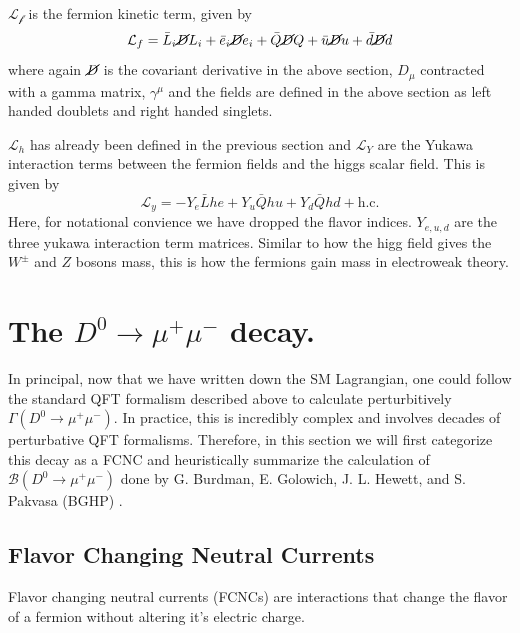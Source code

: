 $\mathcal{L_f}$ is the fermion kinetic term, given by
\begin{equation}
\mathcal{L}_{f} = \bar{L}_{i}\cancel{D}L_{i} + \bar{e}_{i}\cancel{D}e_{i} + \bar{Q}\cancel{D}Q + \bar{u} \cancel{D}u + \bar{d}\cancel{D}d
\label{eq:fermion_kinetic_term}
\end{equation}
where again $\cancel{D}$ is the covariant derivative in the above section, $D_\mu$ contracted with a gamma matrix, $\gamma^\mu$ and the fields are defined in the above section as left handed doublets and right handed singlets.

$\mathcal{L}_h$ has already been defined in the previous section and $\mathcal{L}_Y$ are the Yukawa interaction terms between the fermion fields and the higgs scalar field. This is given by
\begin{equation}
\mathcal{L}_{y} = - Y_{e} \bar{L}he + Y_{u}\bar{Q}h u + Y_{d} \bar{Q}h d
 + \text{h.c.}
\end{equation}
Here, for notational convience we have dropped the flavor indices. $Y_{e,u,d}$ are the three yukawa interaction term matrices. Similar to how the higg field gives the $W^\pm$ and $Z$ bosons mass, this is how the fermions gain mass in electroweak theory. 

\section{The $D^0 \to \mu^+ \mu^-$ decay.}

In principal, now that we have written down the SM Lagrangian, one could follow the standard QFT formalism described above to calculate perturbitively $\Gamma(D^0 \to \mu^+ \mu^-)$. In practice, this is incredibly complex and involves decades of perturbative QFT formalisms. Therefore, in this section we will first categorize this decay as a FCNC and heuristically summarize the calculation of $\mathcal{B}(D^0 \to \mu^+ \mu^-)$ done by G. Burdman, E. Golowich, J. L. Hewett, and S. Pakvasa (BGHP) \cite{ref:burdman_2002}.

\subsection{Flavor Changing Neutral Currents}

Flavor changing neutral currents (FCNCs) are interactions that change the flavor of a fermion without altering it's electric charge. 

